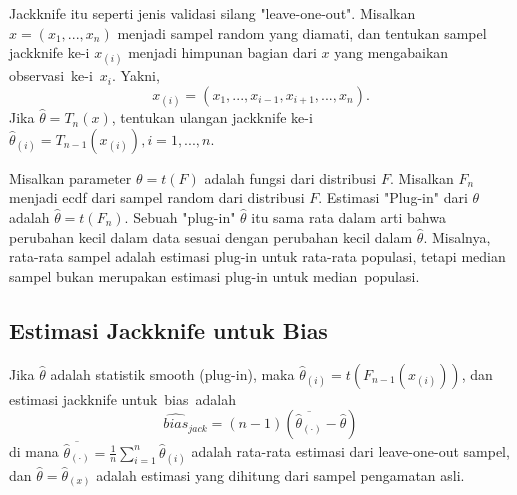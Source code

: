 \documentclass[a4paper,12pt]{article}
\theoremstyle{definition}
\begin{document}
Jackknife itu seperti jenis validasi silang "leave-one-out". Misalkan $x=(x_{1}, ..., x_{n})$ menjadi sampel random yang diamati, dan tentukan sampel jackknife ke-i $x_{(i)}$ menjadi himpunan bagian dari $x$ yang mengabaikan observasi ke-i $x_{i}$. Yakni,
\begin{equation*}
x_{(i)}=(x_{1}, ...,x_{i-1},x_{i+1}, ...,x_{n}).
\end{equation*}
Jika $\hat{\theta} = T_{n}(x)$, tentukan ulangan jackknife ke-i $\hat{\theta}_{(i)} = T_{n-1}(x_{(i)}), i = 1, ..., n$.

Misalkan parameter $\theta = t(F)$ adalah fungsi dari distribusi $F$. Misalkan $F_{n}$ menjadi ecdf dari sampel random dari distribusi $F$. Estimasi "Plug-in" dari $\theta$ adalah $\hat{\theta} = t(F_{n})$.
Sebuah "plug-in" $\hat{\theta}$ itu sama rata dalam arti bahwa perubahan kecil dalam data sesuai dengan perubahan kecil dalam $\hat{\theta}$. Misalnya, rata-rata sampel adalah estimasi plug-in untuk rata-rata populasi, tetapi median sampel bukan merupakan estimasi plug-in untuk median populasi.

\subsection{Estimasi Jackknife untuk Bias}
Jika $\hat{\theta}$ adalah statistik smooth (plug-in), maka $\hat{\theta}_{(i)} = t(F_{n-1}(x_{(i)}))$, dan  estimasi jackknife untuk bias adalah
\begin{equation}
\widehat{bias}_{jack} = (n-1)(\overline{\hat{\theta}_{(\cdot)}}-\hat{\theta})
\end{equation}
di mana $\overline{\hat{\theta}_{(\cdot)}} = \frac{1}{n}\sum_{i=1}^{n}\hat{\theta}_{(i)}$ adalah rata-rata estimasi dari leave-one-out sampel, dan $\hat{\theta} = \hat{\theta}_(x)$ adalah estimasi yang dihitung dari sampel pengamatan asli.
\end{document}
